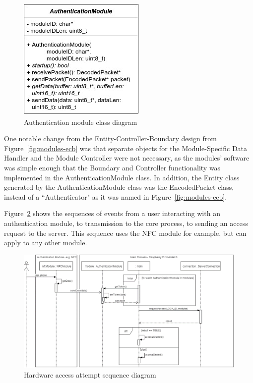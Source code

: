 \documentclass[12pt]{report}
\begin{document}
\begin{figure}
    \centering
    \includegraphics{Diagrams/Hardware-Diagrams/authenticationmodule_class}
    \caption{Authentication module class diagram}
    \label{fig:authentication-module-class-diagram}
\end{figure}

One notable change from the Entity-Controller-Boundary design from Figure~\ref{fig:modules-ecb} was that separate 
objects for the Module-Specific Data Handler and the Module Controller were not necessary, as the modules' software was 
simple enough that the Boundary and Controller functionality was implemented in the AuthenticationModule class. In 
addition, the Entity class generated by the AuthenticationModule class was the EncodedPacket class, instead of a 
``Authenticator" as it was named in Figure~\ref{fig:modules-ecb}.

Figure~\ref{fig:hardware-interaction-sequence} shows the sequences of events from a user interacting with an 
authentication module, to transmission to the core process, to sending an access request to the server. This sequence 
uses the NFC module for example, but can apply to any other module.

\begin{figure}
    \includegraphics[width=\textwidth]{Diagrams/Hardware-Diagrams/hardware_interaction_sequence}
    \caption{Hardware access attempt sequence diagram}
    \label{fig:hardware-interaction-sequence}
\end{figure}
\end{document}
